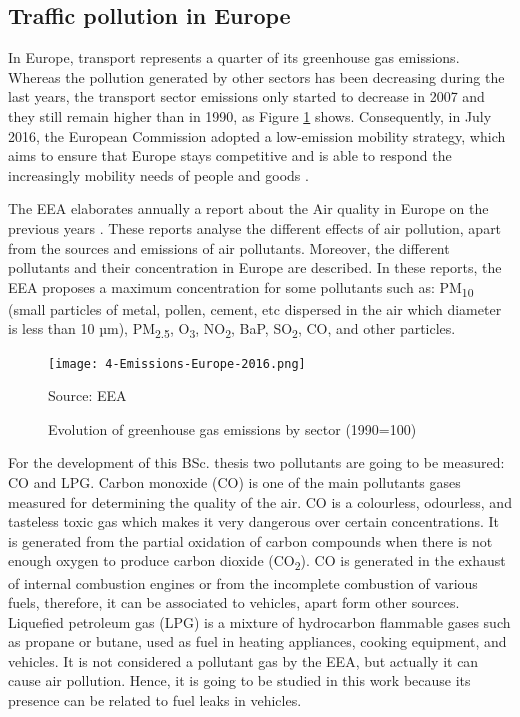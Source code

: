 \subsection{Traffic pollution in Europe}
In Europe, transport represents a quarter of its greenhouse gas emissions. Whereas the pollution generated by other sectors has been decreasing during the last years, the transport sector emissions only started to decrease in 2007 and they still remain higher than in 1990, as Figure \ref{fig:4-Emissions-Europe-2016} shows. Consequently, in July 2016, the European Commission adopted a low-emission mobility strategy, which aims to ensure that Europe stays competitive and is able to respond the increasingly mobility needs of people and goods \cite{EuStrat}. 

The \acf{EEA} elaborates annually a report about the Air quality in Europe on the previous years \cite{AirQualityEEA17}. These reports analyse the different effects of air pollution, apart from the sources and emissions of air pollutants. Moreover, the different pollutants and their concentration in Europe are described. In these reports, the \ac{EEA} proposes a maximum concentration for some pollutants such as: PM\textsubscript{10} (small particles of metal, pollen, cement, etc dispersed in the air which diameter is less than 10 µm), PM\textsubscript{2.5}, O\textsubscript{3}, NO\textsubscript{2}, BaP, SO\textsubscript{2}, CO, and other particles.

\begin{figure}[!h]
	\begin{center}
		\texttt{[image: 4-Emissions-Europe-2016.png]}	
		\caption{Evolution of greenhouse gas emissions by sector (1990=100)}{Source: \acf{EEA}}
		\label{fig:4-Emissions-Europe-2016}
	\end{center}
\end{figure}

For the development of this \ac{BSc.} thesis two pollutants are going to be measured: CO and LPG. Carbon monoxide (CO) is one of the main pollutants gases measured for determining the quality of the air. CO is a colourless, odourless, and tasteless toxic gas which makes it very dangerous over certain concentrations. It is generated from the partial oxidation of carbon compounds when there is not enough oxygen to produce carbon dioxide (CO\textsubscript{2}). CO is generated in the exhaust of internal combustion engines or from the incomplete combustion of various fuels, therefore, it can be associated to vehicles, apart form other sources. Liquefied petroleum gas (LPG) is a mixture of hydrocarbon flammable gases such as propane or butane, used as fuel in heating appliances, cooking equipment, and vehicles. It is not considered a pollutant gas by the \ac{EEA}, but actually it can cause air pollution. Hence, it is going to be studied in this work because its presence can be related to fuel leaks in vehicles.


